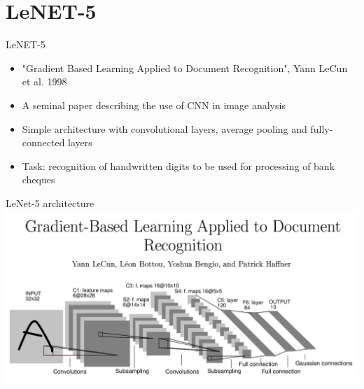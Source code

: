 \documentclass[9pt, aspectratio=169]{beamer}
\begin{document}
\section{LeNET-5}

\begin{frame}
    {LeNET-5}
    \begin{itemize}
        \item "Gradient Based Learning Applied to Document Recognition", Yann LeCun et al. 1998
        \item A seminal paper describing the use of CNN in image analysis
        \item Simple architecture with convolutional layers, average pooling and fully-connected layers
        \item Task: recognition of handwritten digits to be used for processing of bank cheques
    \end{itemize}
\end{frame}

\begin{frame}
    {LeNet-5 architecture}
    \centering
    \includegraphics[width=\textwidth]{LeNet-5.png}
\end{frame}
\end{document}
